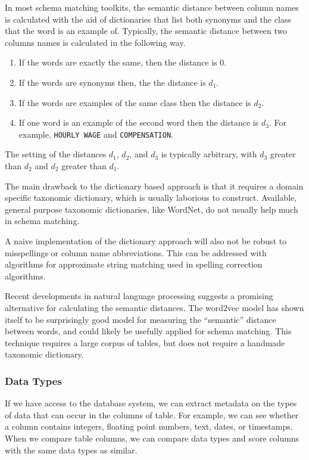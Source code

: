 \documentclass{datamade}
\theoremstyle{definition}
\theoremstyle{remark}
\begin{document}
In most schema matching toolkits, the semantic distance between
column names is calculated with the aid of dictionaries that list
both synonyms and the class that the word is an example of. Typically,
the semantic distance between two columns names is calculated in the
following way.

\begin{enumerate}
  \item If the words are exactly the same, then the distance is $0$.
  \item If the words are synonyms then, the the distance is $d_1$.
  \item If the words are examples of the same class then the distance
    is $d_2$.
  \item If one word is an example of the second word then the distance
    is $d_3$. For example, \verb+HOURLY WAGE+ and \verb+COMPENSATION+.
\end {enumerate}

The setting of the distances $d_1$, $d_2$, and $d_3$ is typically
arbitrary, with $d_3$ greater than $d_2$ and $d_2$ greater than $d_1$.

The main drawback to the dictionary based approach is that it requires
a domain specific taxonomic dictionary, which is usually laborious to
construct. Available, general purpose taxonomic dictionaries, like
WordNet,\cite{wordnet} do not usually help much in schema matching.

A naive implementation of the dictionary approach will also not be
robust to misspellings or column name abbreviations. This can
be addressed with algorithms for approximate string matching used in
spelling correction algorithms. 

Recent developments in natural language processing suggests a
promising alternative for calculating the semantic distances. The
word2vec model has shown itself to be surprisingly good model for
measuring the ``semantic'' distance between words, and could likely be
usefully applied for schema matching. This technique requires a large
corpus of tables, but does not require a handmade taxonomic
dictionary.\cite{gensim}

\subsubsection*{Data Types}
If we have access to the database system, we can extract metadata on
the types of data that can occur in the columns of table. For example,
we can see whether a column contains integers, floating point numbers,
text, dates, or timestamps. When we compare table columns, we can
compare data types and score columns with the same data types as
similar.
\end{document}
